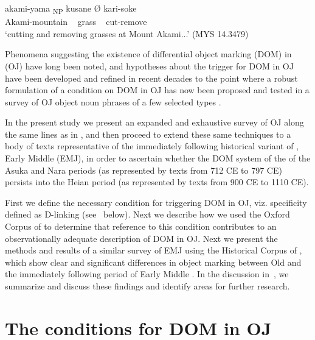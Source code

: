 \documentclass[output=paper]{LSP/langsci}
\begin{document}
\begin{exe}
\ex \label{07-fr-ex:2}%
\gll akami-yama	{\ob}\textsubscript{NP} kusane Ø{\cb}	kari-soke\\
Akami-mountain	~ grass	 ~ cut-remove\\
\glt ‘cutting and removing grasses at Mount Akami...’   (MYS 14.3479)
\end{exe}

Phenomena suggesting the existence of differential object marking
(DOM) in  (OJ) have long been noted, and hypotheses about
the trigger for DOM in OJ have been developed and refined in recent
decades \citep{Motohashi1989Case, Yanagida2006Word,
 Yanagidaetal2009Word} to the point where a robust formulation of a
condition on DOM in OJ has now been proposed and tested in a survey of
OJ object noun phrases of a few selected types
\citet{Frellesvigetal2015Differential}.

In the present study we present an expanded and exhaustive survey of
OJ along the same lines as in \citet{Frellesvigetal2015Differential},
and then proceed to extend these same techniques to a body of texts
representative of the immediately following historical variant of
, Early Middle  (EMJ), in order to ascertain whether
the DOM system of the  of the Asuka and Nara periods (as
represented by texts from 712 CE to 797 CE) persists into the Heian
period (as represented by texts from 900 CE to 1110 CE).

First we define the necessary condition for triggering DOM in OJ,
viz. specificity defined as D-linking (see~
below). Next we describe how we used the Oxford Corpus of 
\citet{Frellesvigetal2014Corpus} to determine that reference to this
condition contributes to an observationally adequate description of
DOM in OJ. Next we present the methods and results of a similar survey
of EMJ using the Historical Corpus of  
\citet{NINJAL}, which
show clear and significant differences in object marking between Old
 and the immediately following period of Early Middle
. In the discussion in~, we summarize and
discuss these findings and identify areas for further research.

\section{The conditions for DOM in OJ}
\label{07-sec:2}
\end{document}
